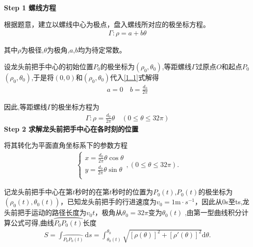 \documentclass[../main.tex]{subfiles}
\begin{document}
  \noindent \textbf{Step 1 螺线方程}
  \par 根据题意，建立以螺线中心为极点，盘入螺线所对应的极坐标方程。
  \begin{align}\label{1..1}
      \varGamma :\rho =a+b\theta 
      \end{align}
      \par 其中\(\rho\)为极径,\(\theta\)为极角,\(a\),\(b\)均为待定常数。
      \par 设龙头前把手中心的初始位置\(P_0\)的极坐标为\((\rho _0,\theta _0)\),等距螺线\(\varGamma\)过原点\(O\)和起点\(P_0\)\((\rho _0,\theta _0)\),于是将\((0,0)\)和\((\rho _0,\theta _0)\)代入\eqref{1..1}式解得
      \begin{align}\label{1.........1}
          a = 0\quad b = \frac{d_0}{2\pi} 
      \end{align}
      \par 因此,等距螺线\(\varGamma\)的极坐标方程为
      \begin{align}
      \varGamma :\rho =\frac{d_0}{2\pi}\theta\quad (0\leqslant \theta \leqslant 32\pi) \label{0.1}
      \end{align}
      \textbf{Step 2 求解龙头前把手中心在各时刻的位置}
      \par 将其转化为平面直角坐标系下的参数方程
      \begin{align}
      \begin{cases}
      x=\frac{d_0}{2\pi}\theta \cos \theta\\
      y=\frac{d_0}{2\pi}\theta \sin \theta\\
      \end{cases},(0\leqslant \theta \leqslant 32\pi) .\label{0.0}
      \end{align}
      
      \par 记龙头前把手中心在第\(t\)秒时的在第\(t\)秒时的位置为\(P_0(t)\),\(P_0(t)\)的极坐标为\((\rho _0(t),\theta _0(t))\)，已知龙头前把手的行进速度为\(v_0 = 1\mathrm{m}\cdot s^{-1}\)，因此从0s至ts,龙头前把手运动的路径长度为$v_0t$，极角从$\theta_0=32\pi $变为$\theta _0\left( t \right)$ ,由第一型曲线积分计算公式可得,曲线$\wideparen{P_0P_0\left( t \right) }$长度
      \begin{align}
          S=\int_{\wideparen{P_0P_0(t)}}{\mathrm{d}s}=\int_{\theta _0(t)}^{\theta _0}{\sqrt{[\rho (\theta )]^2+[\rho ' (\theta )]^2}\mathrm{d}\theta}.\label{1.1}
          \end{align}
     
\end{document}
